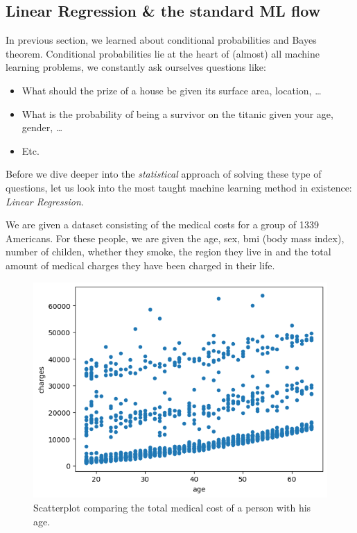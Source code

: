 \documentclass[10pt]{extarticle}
\newcommand{\<}{\langle}
\renewcommand{\>}{\rangle}
\theoremstyle{mystyle}{\newtheorem*{remark}{Remark}}
\theoremstyle{mystyle}{\newtheorem*{remarks}{Remarks}}
\theoremstyle{mystyle}{\newtheorem*{example}{Example}}
\theoremstyle{mystyle}{\newtheorem*{examples}{Examples}}
\theoremstyle{definition}{\newtheorem*{exercise}{Exercise}}
\theoremstyle{warn}
\begin{document}
\subsection{Linear Regression \& the standard ML flow} \label{sec:linreg}
In previous section, we learned about conditional probabilities and Bayes theorem. Conditional probabilities lie at the heart of (almost) all machine learning problems, we constantly ask ourselves questions like:
\begin{itemize}
\item What should the prize of a house be given its surface area, location, \dots
\item What is the probability of being a survivor on the titanic given your age, gender, \dots
\item Etc.
\end{itemize}
Before we dive deeper into the \textit{statistical} approach of solving these type of questions, let us look into the most taught machine learning method in existence: \textit{Linear Regression}.

We are given a dataset consisting of the medical costs for a group of 1339 Americans. For these people, we are given the age, sex, bmi (body mass index), number of childen, whether they smoke, the region they live in and the total amount of medical charges they have been charged in their life.

\begin{figure}
\begin{center}
\includegraphics[scale=0.4]{figures/6.5_linear_regression.png}
\caption{Scatterplot comparing the total medical cost of a person with his age.} \label{fig:6.5_linear_regression}
\end{center}
\end{figure}
\end{document}
